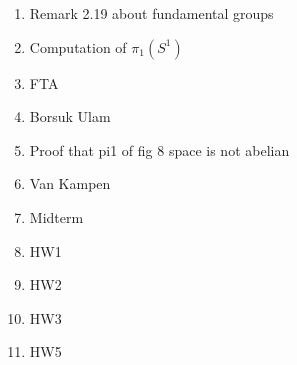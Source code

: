 \documentclass[12pt]{article}
\begin{document}


\begin{enumerate}  
    \item Remark 2.19 about fundamental groups
    \item Computation of $\pi_1(S^1)$
    \item FTA
    \item Borsuk Ulam
    \item Proof that pi1 of fig 8 space is not abelian 
    \item Van Kampen
    \item Midterm
    \item HW1
    \item HW2
    \item HW3
    \item HW5
\end{enumerate}
\end{document}
